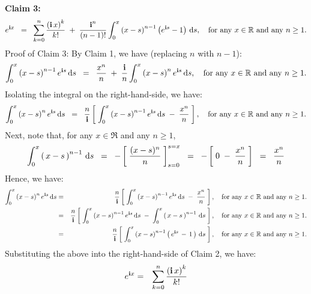 \begin{center}
\begin{minipage}{6.5in}
\noindent
\textbf{Claim 3:}
\begin{equation*}
e^{\textnormal{\bf i} x}
\;\;=\;\;
\sum_{k=0}^{n}\dfrac{\left(\textnormal{\bf i}\,x\right)^{k}}{k!}
\;+\; \dfrac{\textnormal{\bf i}^{n}}{(n-1)!}\int_{0}^{x}\left(x-s\right)^{n-1}\left(e^{\textnormal{\bf i} s}-1\right)\,\textnormal{d} s,
\quad
\textnormal{for any $x \in \mathbb{R}$ and any $n \geq 1$.}
\end{equation*}
Proof of Claim 3: By Claim 1, we have (replacing $n$ with $n-1$):
\begin{equation*}
\int_{0}^{x}\left(x-s\right)^{n-1}e^{\textnormal{\bf i} s}\,\textnormal{d} s
\;\;=\;\;
\dfrac{x^{n}}{n} \;+\; \dfrac{\textnormal{\bf i}}{n}\int_{0}^{x}\left(x-s\right)^{n}e^{\textnormal{\bf i} s}\,\textnormal{d} s,
\quad
\textnormal{for any $x \in \mathbb{R}$ and any $n \geq 1$}.
\end{equation*}
Isolating the integral on the right-hand-side, we have:
\begin{equation*}
\int_{0}^{x}\left(x-s\right)^{n}e^{\textnormal{\bf i} s}\,\textnormal{d} s
\;\;=\;\;
\frac{n}{\textnormal{\bf i}}\left[\;
\int_{0}^{x}\left(x-s\right)^{n-1}e^{\textnormal{\bf i} s}\,\textnormal{d} s
\; - \;
\dfrac{x^{n}}{n}
\;\right],
\quad
\textnormal{for any $x \in \mathbb{R}$ and any $n \geq 1$}.
\end{equation*}
Next, note that, for any $x \in \Re$ and any $n \geq 1$,
\begin{equation*}
\int_{0}^{x}\left(\,x-s\,\right)^{n-1}\,\textnormal{d} s
\;\;=\;\; - \left[\;\dfrac{(x-s)^{n}}{n}\;\right]_{s=0}^{s=x}
\;\;=\;\; - \left[\;0 \; - \; \dfrac{x^{n}}{n}\;\right]
\;\;=\;\; \dfrac{x^{n}}{n}
\end{equation*}
Hence, we have:
\begin{eqnarray*}
\int_{0}^{x}\left(x-s\right)^{n}e^{\textnormal{\bf i} s}\,\textnormal{d} s
&=&
\frac{n}{\textnormal{\bf i}}\left[\;
\int_{0}^{x}\left(x-s\right)^{n-1}e^{\textnormal{\bf i} s}\,\textnormal{d} s
\; - \;
\dfrac{x^{n}}{n}
\;\right],
\quad
\textnormal{for any $x \in \mathbb{R}$ and any $n \geq 1$}.
\\
&=&
\frac{n}{\textnormal{\bf i}}\left[\;
\int_{0}^{x}\left(x-s\right)^{n-1}e^{\textnormal{\bf i} s}\,\textnormal{d} s
\; - \;
\int_{0}^{x}\left(\,x-s\,\right)^{n-1}\,\textnormal{d} s
\;\right],
\quad
\textnormal{for any $x \in \mathbb{R}$ and any $n \geq 1$}.
\\
&=&
\frac{n}{\textnormal{\bf i}}\left[\;
\int_{0}^{x}\left(x-s\right)^{n-1}\left(\,e^{\textnormal{\bf i} s}\,-\,1\,\right)\,\textnormal{d} s
\;\right],
\quad
\textnormal{for any $x \in \mathbb{R}$ and any $n \geq 1$}.
\end{eqnarray*}
Substituting the above into the right-hand-side of Claim 2, we have:
\begin{eqnarray*}
e^{\i x}
&=&
\sum_{k=0}^{n}\dfrac{\left(\i\,x\right)^{k}}{k!}

\end{eqnarray*}
\end{minipage}
\end{center}
